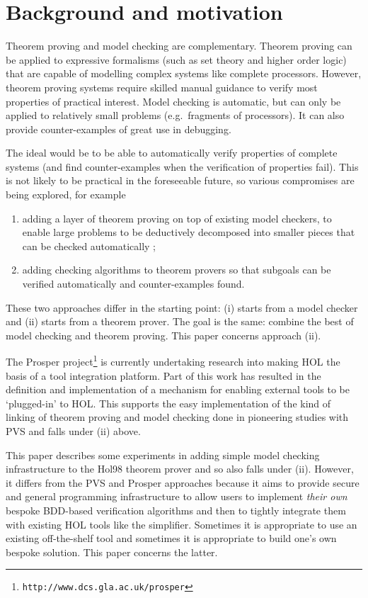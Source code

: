 \documentclass[12pt]{article}
\newenvironment{greekenumerate}{\begin{enumerate}
  \renewcommand{\theenumi}{\roman{enumi}}
  \renewcommand{\labelenumi}{(\roman{enumi})}}{\end{enumerate}}
\newcommand\HOL{HOL\xspace}
\newcommand\Hol{Hol98\xspace}
\begin{document}
\section{Background and motivation}

Theorem proving and model checking are complementary. Theorem proving
can be applied to expressive formalisms (such as set theory and higher
order logic) that are capable of modelling complex systems like
complete processors. However, theorem proving systems require skilled
manual guidance to verify most properties of practical interest. Model
checking is automatic, but can only be applied to relatively small
problems (e.g.~fragments of processors). It can also provide
counter-examples of great use in debugging.

The ideal would be to be able to automatically verify properties of
complete systems (and find counter-examples when the verification of
properties fail).  This is not likely to be practical in the
foreseeable future, so various compromises are being explored, for
example

\begin{greekenumerate}
\item adding a layer of theorem proving on top of existing model
checkers, to enable large problems to be deductively decomposed into
smaller pieces that can be checked automatically 
\cite{McMillan99,aagaard-tphols-99};

\item adding checking algorithms to theorem provers so that subgoals
can be verified automatically \cite{Rajan95:CAV} and counter-examples found.
\end{greekenumerate}

These two approaches differ in the starting point: (i) starts from a
model checker and (ii) starts from a theorem prover. The goal is the same: 
combine the best of model checking and theorem proving. This paper concerns approach (ii).

The Prosper
project\footnote{\tt{http://www.dcs.gla.ac.uk/prosper}}  is
currently undertaking research into making \HOL{} the basis of a tool
integration platform. Part of this work has resulted in the definition
and implementation of a mechanism for enabling external tools to
be `plugged-in' to \HOL.  This supports the easy implementation of the
kind of linking of theorem proving and model checking done in
pioneering studies with PVS \cite{Rajan95:CAV} and falls under (ii) above.

This paper describes some experiments in adding simple model checking
infrastructure to the \Hol{} theorem prover and so also falls under
(ii).  However, it differs from the PVS and Prosper approaches because
it aims to provide secure and general programming infrastructure to
allow users to implement {\em their own} bespoke BDD-based
verification algorithms and then to tightly integrate them with
existing \HOL{} tools like the simplifier. Sometimes it is appropriate
to use an existing off-the-shelf tool and sometimes it is appropriate
to build one's own bespoke solution. This paper concerns the latter.
\end{document}
